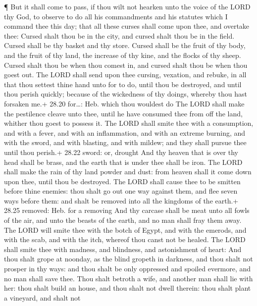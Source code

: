  ¶ But it shall come to pass, if thou wilt not hearken unto
the voice of the LORD thy God, to observe to do all his commandments and
his statutes which I command thee this day; that all these curses shall
come upon thee, and overtake thee:  Cursed shalt thou be in
the city, and cursed shalt thou be in the field.  Cursed
shall be thy basket and thy store.  Cursed shall be the
fruit of thy body, and the fruit of thy land, the increase of thy kine,
and the flocks of thy sheep.  Cursed shalt thou be when
thou comest in, and cursed shalt thou be when thou goest out.
 The LORD shall send upon thee cursing, vexation, and
rebuke, in all that thou settest thine hand unto for to do, until thou
be destroyed, and until thou perish quickly; because of the wickedness
of thy doings, whereby thou hast forsaken me.+ 28.20 for\ldots: Heb.
which thou wouldest do  The LORD shall make the pestilence
cleave unto thee, until he have consumed thee from off the land, whither
thou goest to possess it.  The LORD shall smite thee with a
consumption, and with a fever, and with an inflammation, and with an
extreme burning, and with the sword, and with blasting, and with mildew;
and they shall pursue thee until thou perish.+ 28.22 sword: or, drought
 And thy heaven that is over thy head shall be brass, and
the earth that is under thee shall be iron.  The LORD shall
make the rain of thy land powder and dust: from heaven shall it come
down upon thee, until thou be destroyed.  The LORD shall
cause thee to be smitten before thine enemies: thou shalt go out one way
against them, and flee seven ways before them: and shalt be removed into
all the kingdoms of the earth.+ 28.25 removed: Heb. for a removing
 And thy carcase shall be meat unto all fowls of the air,
and unto the beasts of the earth, and no man shall fray them away.
 The LORD will smite thee with the botch of Egypt, and with
the emerods, and with the scab, and with the itch, whereof thou canst
not be healed.  The LORD shall smite thee with madness, and
blindness, and astonishment of heart:  And thou shalt grope
at noonday, as the blind gropeth in darkness, and thou shalt not prosper
in thy ways: and thou shalt be only oppressed and spoiled evermore, and
no man shall save thee.  Thou shalt betroth a wife, and
another man shall lie with her: thou shalt build an house, and thou
shalt not dwell therein: thou shalt plant a vineyard, and shalt not
